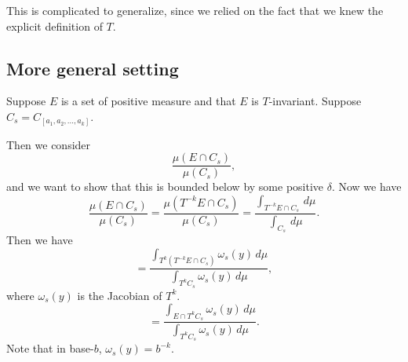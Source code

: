 \documentclass{article}
\begin{document}
This is complicated to generalize, since we relied on the 
fact that we knew the explicit definition of $T$.

\subsection{More general setting}

Suppose $E$ is a set of positive measure and that $E$ is 
$T$-invariant.
Suppose $C_s = C_{[a_1,a_2,\ldots,a_k]}$.

Then we consider
\[\frac{\mu(E\cap C_s)}{\mu(C_s)},\]
and we want to show that this is bounded below by some
positive $\delta$.
Now we have
\[\frac{\mu(E\cap C_s)}{\mu(C_s)}= 
\frac{\mu(T^{-k}E\cap C_s)}{\mu(C_s)}
= \frac{\int_{T^{-k}E\cap C_s}\,d\mu}{\int_{C_s}\,d\mu}.
\]
Then we have
\[
= \frac{\int_{T^k(T^{-k}E\cap C_s)}
\omega_s(y)\,d\mu}{\int_{T^kC_s}\omega_s(y)\,d\mu},
\]
where $\omega_s(y)$ is the Jacobian of $T^k$.
\[
= \frac{\int_{E\cap T^kC_s}
\omega_s(y)\,d\mu}{\int_{T^kC_s}\omega_s(y)\,d\mu}.
\]
Note that in base-$b$, $\omega_s(y) = b^{-k}$.
\end{document}
